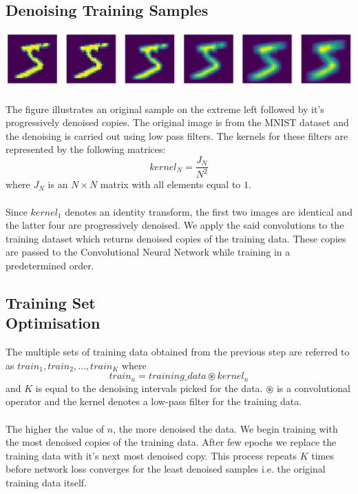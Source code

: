 \documentclass[12pt]{article}
\begin{document}
\begin{multicols}{2}
		\subsection{Denoising Training Samples}
		\includegraphics[width=\linewidth]{assets/denoise.png}
		\\\\
		The figure illustrates an original sample on the extreme left followed by it's progressively denoised copies. The original image is from the MNIST dataset and the denoising is carried out using low pass filters. The kernels for these filters are represented by the following matrices:
		$$ kernel_{N} = \frac{J_{N}}{N^2} $$
		where $J_{N}$ is an $N \times N$ matrix with all elements equal to $1$.
		\\\\
		Since $kernel_{1}$ denotes an identity transform, the first two images are identical and the latter four are progressively denoised. We apply the said convolutions to the training dataset which returns denoised copies of the training data. These copies are passed to the Convolutional Neural Network while training in a predetermined order.
		\subsection{Training Set \\Optimisation}
		The multiple sets of training data obtained from the previous step are referred to as $train_{1},train_{2}, \hdots ,train_{K}$ where 
		$$train_{n} = training\_data \circledast kernel_{n} $$
		and $K$ is equal to the denoising intervals picked for the data. $\circledast$ is a convolutional operator and the kernel denotes a low-pass filter for the training data. 
		\\\\
		The higher the value of $n$, the more denoised the data. We begin training with the most denoised copies of the training data. After few epochs we replace the training data with it's next most denoised copy. This process repeats $K$ times before network loss converges for the least denoised samples i.e. the original training data itself.
		

\end{multicols}
\end{document}
